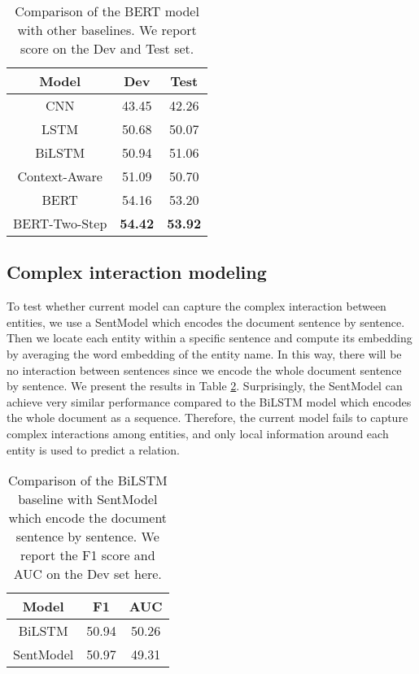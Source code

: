 \documentclass[11pt,a4paper]{article}
\begin{document}
\begin{table}[]
    \centering
    \begin{tabular}{c|c|c}\toprule
         Model & Dev & Test  \\\midrule
         CNN & 43.45 & 42.26\\
         LSTM & 50.68 & 50.07 \\
         BiLSTM & 50.94 & 51.06\\
         Context-Aware & 51.09 & 50.70\\\midrule
         BERT & 54.16 & 53.20 \\
         BERT-Two-Step & \bf 54.42 & \bf 53.92 \\\bottomrule
    \end{tabular}
    \caption{Comparison of the BERT model with other baselines. We report  score on the Dev and Test set.}
    \label{tab:result}
\end{table}{}

\subsection{Complex interaction modeling}
To test whether current model can capture the complex interaction between entities, we use a SentModel which encodes the document sentence by sentence. Then we locate each entity within a specific sentence and compute its embedding by averaging the word embedding of the entity name. 
In this way, there will be no interaction between sentences since we encode the whole document sentence by sentence. We present the results in Table \ref{tab:sent}. Surprisingly, the SentModel can achieve very similar performance compared to the BiLSTM model which encodes the whole document as a sequence. Therefore, the current model fails to capture complex interactions among entities, and only local information around each entity is used to predict a relation.

\begin{table}[]
    \centering
    \begin{tabular}{c|c|c}\toprule
        Model & F1 & AUC \\\midrule
        BiLSTM & 50.94 & 50.26\\
        SentModel & 50.97 & 49.31 \\\bottomrule
    \end{tabular}
    \caption{Comparison of the BiLSTM baseline with SentModel which encode the document sentence by sentence. We report the F1 score and AUC on the Dev set here.}
    \label{tab:sent}
\end{table}{}
\end{document}
